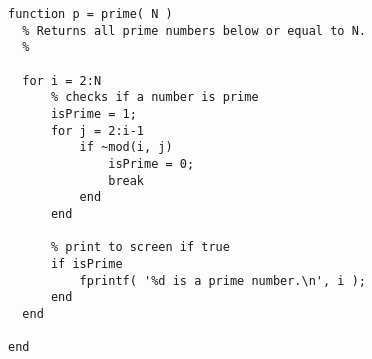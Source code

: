 \begin{lstlisting}[framerule=2pt,rulecolor=\color{goodgreen},float,caption={The same code as in listing~\ref{listing:prime1}, with rules of style applied. It should now be somewhat easier to maintain and improve the code. Do you have ideas how to speed it up?}]
function p = prime( N )
  % Returns all prime numbers below or equal to N.
  %

  for i = 2:N
      % checks if a number is prime
      isPrime = 1;
      for j = 2:i-1
          if ~mod(i, j)
              isPrime = 0;
              break
          end
      end

      % print to screen if true
      if isPrime
          fprintf( '%d is a prime number.\n', i );
      end
  end

end
\end{lstlisting}
